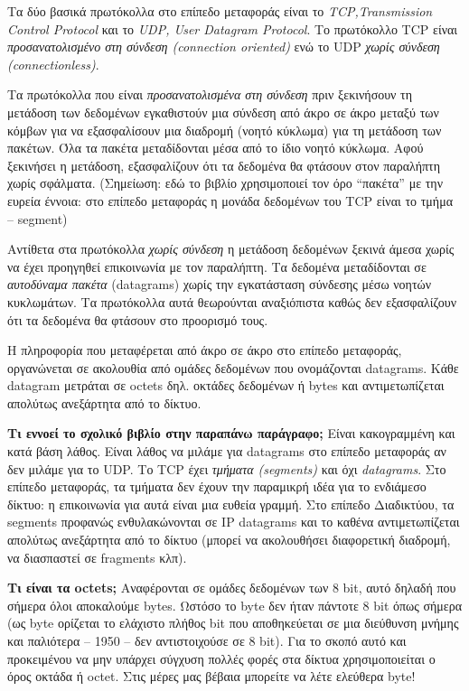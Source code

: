 Τα δύο βασικά πρωτόκολλα στο επίπεδο μεταφοράς είναι το \emph{TCP,Transmission Control Protocol} και το \emph{UDP, User Datagram Protocol}. Το πρωτόκολλο TCP είναι \emph{προσανατολισμένο στη σύνδεση (connection oriented)} ενώ το UDP \emph{χωρίς σύνδεση (connectionless)}.

Τα πρωτόκολλα που είναι \emph{προσανατολισμένα στη σύνδεση} πριν ξεκινήσουν τη μετάδοση των δεδομένων εγκαθιστούν μια σύνδεση από άκρο σε άκρο μεταξύ των κόμβων για να εξασφαλίσουν μια διαδρομή (νοητό κύκλωμα) για τη μετάδοση των πακέτων. Όλα τα πακέτα μεταδίδονται μέσα από το ίδιο νοητό κύκλωμα. Αφού ξεκινήσει η μετάδοση, εξασφαλίζουν ότι τα δεδομένα θα φτάσουν στον παραλήπτη χωρίς σφάλματα. (Σημείωση: εδώ το βιβλίο χρησιμοποιεί τον όρο ``πακέτα'' με την ευρεία έννοια: στο επίπεδο μεταφοράς η μονάδα δεδομένων του TCP είναι το τμήμα -- segment)

Αντίθετα στα πρωτόκολλα \emph{χωρίς σύνδεση} η μετάδοση δεδομένων ξεκινά άμεσα χωρίς να έχει προηγηθεί επικοινωνία με τον παραλήπτη. Τα δεδομένα μεταδίδονται σε \emph{αυτοδύναμα πακέτα} (datagrams) χωρίς την εγκατάσταση σύνδεσης μέσω νοητών κυκλωμάτων. Τα πρωτόκολλα αυτά θεωρούνται αναξιόπιστα καθώς δεν εξασφαλίζουν ότι τα δεδομένα θα φτάσουν στο προορισμό τους.

Η πληροφορία που μεταφέρεται από άκρο σε άκρο στο επίπεδο μεταφοράς,  οργανώνεται σε ακολουθία από ομάδες δεδομένων που ονομάζονται datagrams. Κάθε datagram μετράται σε octets δηλ. οκτάδες δεδομένων ή bytes και αντιμετωπίζεται απολύτως ανεξάρτητα από το δίκτυο.

\begin{inthebox}
\textbf{Τι εννοεί το σχολικό βιβλίο στην παραπάνω παράγραφο;} Είναι κακογραμμένη και κατά βάση λάθος.  Είναι λάθος να μιλάμε για datagrams στο επίπεδο μεταφοράς αν δεν μιλάμε για το UDP. Το TCP έχει \emph{τμήματα (segments)} και όχι \emph{datagrams}. Στο επίπεδο μεταφοράς, τα τμήματα δεν έχουν την παραμικρή ιδέα για το ενδιάμεσο δίκτυο: η επικοινωνία για αυτά είναι μια ευθεία γραμμή. Στο επίπεδο Διαδικτύου, τα segments προφανώς ενθυλακώνονται σε IP datagrams και το καθένα αντιμετωπίζεται απολύτως ανεξάρτητα από το δίκτυο (μπορεί να ακολουθήσει διαφορετική διαδρομή, να διασπαστεί σε fragments κλπ).\\ 
\end{inthebox}

\textbf{Τι είναι τα octets;} Αναφέρονται σε ομάδες δεδομένων των 8 bit, αυτό δηλαδή που σήμερα όλοι αποκαλούμε bytes. Ωστόσο το byte δεν ήταν πάντοτε 8 bit όπως σήμερα (ως byte ορίζεται το ελάχιστο πλήθος bit που αποθηκεύεται σε μια διεύθυνση μνήμης και παλιότερα -- 1950 -- δεν αντιστοιχούσε σε 8 bit). Για το σκοπό αυτό και προκειμένου να μην υπάρχει σύγχυση πολλές φορές στα δίκτυα χρησιμοποιείται ο όρος οκτάδα ή octet. Στις μέρες μας βέβαια μπορείτε να λέτε ελεύθερα byte! 

 
